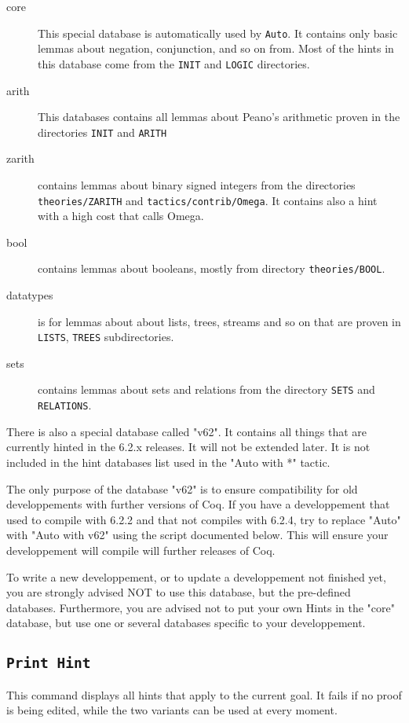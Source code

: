 \begin{description}
\item[core] This special database is automatically used by
  \texttt{Auto}. It contains only basic lemmas about negation,
  conjunction, and so on from. Most of the hints in this database come 
  from the \texttt{INIT} and \texttt{LOGIC} directories.

\item[arith] This databases contains all lemmas about Peano's
  arithmetic proven in the directories \texttt{INIT} and
  \texttt{ARITH}

\item[zarith] contains lemmas about binary signed integers from the
  directories \texttt{theories/ZARITH} and
  \texttt{tactics/contrib/Omega}. It contains also a hint with a high
  cost that calls Omega.

\item[bool] contains lemmas about booleans, mostly from directory
  \texttt{theories/BOOL}.

\item[datatypes] is for lemmas about about lists, trees, streams and so on that 
  are proven in \texttt{LISTS}, \texttt{TREES} subdirectories.

\item[sets] contains lemmas about sets and relations from the 
  directory \texttt{SETS} and \texttt{RELATIONS}.
\end{description}

There is also a special database called "v62". It contains all things that are
currently hinted in the 6.2.x releases. It will not be extended later. It is
not included in the hint databases list used in the "Auto with *" tactic.

The only purpose of the database "v62" is to ensure compatibility for
old developpements with further versions of Coq. 
If you have a developpement that used to compile with 6.2.2 and that not
compiles with 6.2.4, try to replace "Auto" with "Auto with v62" using the
script documented below. This will ensure your developpement will compile
will further releases of Coq.

To write a new developpement, or to update a developpement not finished yet, 
you are strongly advised NOT to use this database, but the pre-defined
databases. Furthermore, you are advised not to put your own Hints in the
"core" database, but use one or several databases specific to your
developpement.

\subsection{\tt Print Hint}
\label{PrintHint}
This command displays all hints that apply to the current goal. It
fails if no proof is being edited, while the two variants can be used at
every moment.

